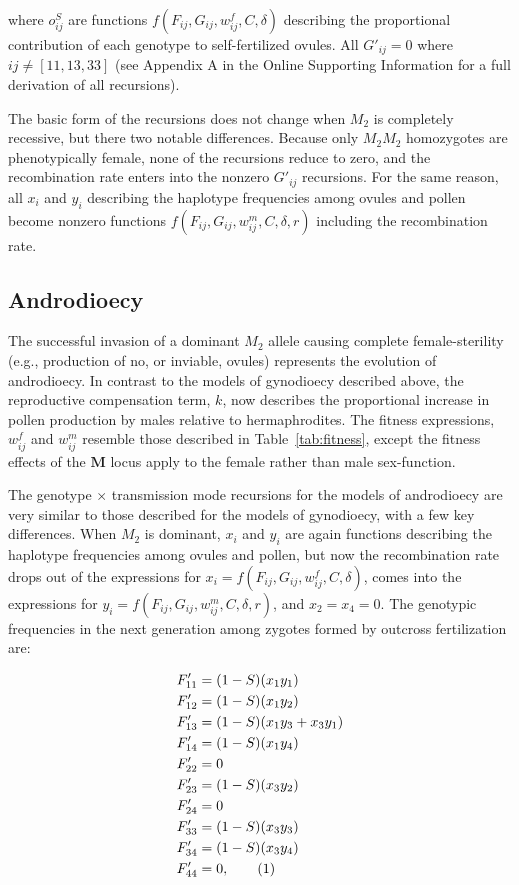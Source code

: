\documentclass[9pt,twocolumn,twoside,lineno]{gsajnl}
\newcommand\numberthis{\addtocounter{equation}{1}\tag{\theequation}}
\begin{document}
\noindent where $o^S_{ij}$ are functions $f(F_{ij},G_{ij},w^f_{ij},C,\delta)$ describing the proportional contribution of each genotype to self-fertilized ovules. All $G'_{ij} = 0$ where $ij \neq [11,13,33]$ (see Appendix A in the Online Supporting Information for a full derivation of all recursions). 

The basic form of the recursions does not change when $M_2$ is completely recessive, but there two notable differences. Because only $M_2M_2$ homozygotes are phenotypically female, none of the recursions reduce to zero, and the recombination rate enters into the nonzero $G'_{ij}$ recursions. For the same reason, all $x_i$ and $y_i$ describing the haplotype frequencies among ovules and pollen become nonzero functions $f(F_{ij},G_{ij},w^m_{ij},C,\delta,r)$ including the recombination rate.


\subsection{Androdioecy}

The successful invasion of a dominant $M_2$ allele causing complete female-sterility (e.g., production of no, or inviable, ovules) represents the evolution of androdioecy. In contrast to the models of gynodioecy described above, the reproductive compensation term, $k$, now describes the proportional increase in pollen production by males relative to hermaphrodites. The fitness expressions, $w^f_{ij}$ and $w^m_{ij}$ resemble those described in Table~\ref{tab:fitness}, except the fitness effects of the $\mathbf{M}$ locus apply to the female rather than male sex-function. 

The genotype $\times$ transmission mode recursions for the models of androdioecy are very similar to those described for the models of gynodioecy, with a few key differences. When $M_2$ is dominant, $x_{i}$ and $y_{i}$ are again functions describing the haplotype frequencies among ovules and pollen, but now the recombination rate drops out of the expressions for $x_i=f(F_{ij},G_{ij},w^f_{ij},C,\delta)$, comes into the expressions for $y_i=f(F_{ij},G_{ij},w^m_{ij},C,\delta,r)$, and $x_2=x_4=0$. The genotypic frequencies in the next generation among zygotes formed by outcross fertilization are:
\begin{linenomath}\begin{align*} \label{eq:FprAnd}
    F'_{11} &= (1 - S) (x_1 y_1) \\
    F'_{12} &= (1 - S) (x_1 y_2) \\
    F'_{13} &= (1 - S) (x_1 y_3 + x_3 y_1) \\
    F'_{14} &= (1 - S) (x_1 y_4) \\
    F'_{22} &= 0 \\
    F'_{23} &= (1 - S) (x_3 y_2) \\
    F'_{24} &= 0 \\
    F'_{33} &= (1 - S) (x_3 y_3) \\
    F'_{34} &= (1 - S) (x_3 y_4) \\
    F'_{44} &= 0, \numberthis
\end{align*} \end{linenomath}
\end{document}
